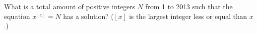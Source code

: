 \problem
What is a total amount of positive integers $N$ from 1 to 2013 such that
the equation $x^{[x]}=N$ has a solution?
($[x]$ is the largest integer less or equal than $x$.)
\solution
\endproblem
